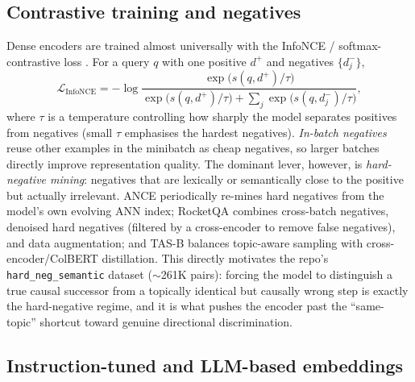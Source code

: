\subsection{Contrastive training and negatives}
\label{sec:emb:contrastive}

Dense encoders are trained almost universally with the InfoNCE / softmax-contrastive
loss \citep{emb:oord2018infonce}. For a query $q$ with one positive $d^+$ and
negatives $\{d_j^-\}$,
\[
\mathcal{L}_{\mathrm{InfoNCE}}=-\log
\frac{\exp\!\big(s(q,d^+)/\tau\big)}
{\exp\!\big(s(q,d^+)/\tau\big)+\sum_j \exp\!\big(s(q,d_j^-)/\tau\big)},
\]
where $\tau$ is a temperature controlling how sharply the model separates positives
from negatives (small $\tau$ emphasises the hardest negatives). \emph{In-batch
negatives} reuse other examples in the minibatch as cheap negatives, so larger
batches directly improve representation quality. The dominant lever, however, is
\emph{hard-negative mining}: negatives that are lexically or semantically close to the
positive but actually irrelevant. ANCE \citep{emb:xiong2021ance} periodically re-mines
hard negatives from the model's own evolving ANN index; RocketQA
\citep{emb:qu2021rocketqa} combines cross-batch negatives, denoised hard negatives
(filtered by a cross-encoder to remove false negatives), and data augmentation; and
TAS-B \citep{emb:hofstatter2021tasb} balances topic-aware sampling with
cross-encoder/ColBERT distillation. This directly motivates the repo's
\texttt{hard\_neg\_semantic} dataset ($\sim$261K pairs): forcing the model to
distinguish a true causal successor from a topically identical but causally wrong step
is exactly the hard-negative regime, and it is what pushes the encoder past the
``same-topic'' shortcut toward genuine directional discrimination.

\subsection{Instruction-tuned and LLM-based embeddings}
\label{sec:emb:llm}

